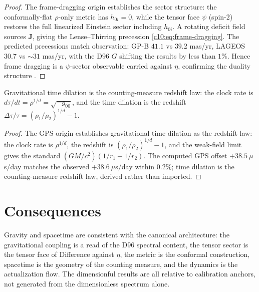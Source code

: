 \begin{proof}
The frame-dragging origin \cite{c10:QG186} establishes the sector structure: the
conformally-flat $\rho$-only metric has $h_{0i} = 0$, while the tensor face $\psi$ (spin-2)
restores the full linearized Einstein sector including $h_{0i}$.
A rotating deficit field sources $\mathbf{J}$, giving the Lense--Thirring precession
\eqref{c10:eq:frame-dragging}. The predicted precessions match observation: GP-B $41.1$ vs
$39.2$ mas/yr, LAGEOS $30.7$ vs $\sim31$ mas/yr, with the D96 $G$ shifting the results by
less than $1\%$. Hence frame dragging is a $\psi$-sector observable carried against $\eta$,
confirming the duality structure \cite{c10:QG286}.
\end{proof}

\begin{lemma}
\label{c10:lem:gps-redshift}
Gravitational time dilation is the counting-measure redshift law: the clock rate is
$d\tau/dt = \rho^{1/d} = \sqrt{-g_{00}}$, and the time dilation is the redshift
$\Delta\tau/\tau = (\rho_1/\rho_2)^{1/d} - 1$.
\end{lemma}

\begin{proof}
The GPS origin \cite{c10:QG187} establishes gravitational time dilation as the redshift law:
the clock rate is $\rho^{1/d}$, the redshift is
$(\rho_1/\rho_2)^{1/d}-1$, and the weak-field limit gives the standard
$(GM/c^2)(1/r_1-1/r_2)$. The computed GPS offset $+38.5\ \mu$s/day matches the observed
$+38.6\ \mu$s/day within $0.2\%$; time dilation is the counting-measure redshift law,
derived rather than imported.
\end{proof}

\section{Consequences}
\label{c10:sec:gravity-consequences}

\begin{theorem}
\label{c10:thm:gravity-consistent}
Gravity and spacetime are consistent with the canonical architecture: the gravitational
coupling is a read of the D96 spectral content, the tensor sector is the tensor face of
Difference against $\eta$, the metric is the conformal construction, spacetime is the
geometry of the counting measure, and the dynamics is the actualization flow. The
dimensionful results are all relative to calibration anchors, not generated from the
dimensionless spectrum alone.
\end{theorem}


